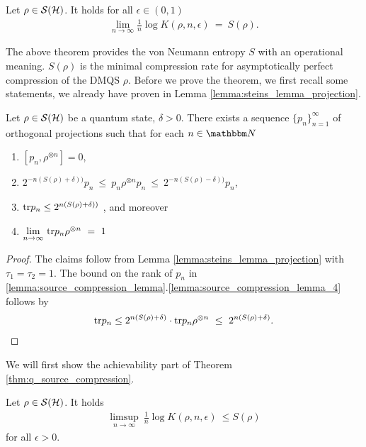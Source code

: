 \begin{theorem} \label{thm:q_source_compression}
 Let $\rho \in {\mathcal S}({\mathcal H})$. It holds for all $\epsilon \in (0,1)$ 
 \begin{align*}
  \underset{n \rightarrow \infty}{\lim} \frac{1}{n} \log K(\rho, n, \epsilon) \ = \ S(\rho).
 \end{align*}
 \end{theorem}
 The above theorem provides the von Neumann entropy $S$ with an operational meaning. $S(\rho)$ is 
 the minimal compression rate for asymptotically perfect compression of the DMQS $\rho$. 
 Before we prove the theorem, we first recall some statements, we already have proven in Lemma \ref{lemma:steins_lemma_projection}. 
\begin{lemma}
 Let $\rho \in {\mathcal S}({\mathcal H})$ be a quantum state, $\delta > 0$. There exists a sequence $\{p_n\}_{n=1}^\infty$ of orthogonal projections such that for each $n \in \bbmN$
 \begin{enumerate} \label{lemma:source_compression_lemma}
  \item $[p_n, \rho^{\otimes n}] = 0$, \label{lemma:source_compression_lemma_1}
  \item $2^{-n(S(\rho) + \delta))} p_n \ \leq \ p_n \rho^{\otimes n} p_n \ \leq \ 2^{-n(S(\rho) - \delta))} p_n$, 
  \item $\mathrm{tr} p_n \leq 2^{n(S(\rho) + \delta))}$ , and moreover \label{lemma:source_compression_lemma_4}
  \item $\underset{n \rightarrow \infty}{\lim} \ \mathrm{tr} p_n  \rho^{\otimes n} \ = \ 1$ \label{lemma:source_compression_lemma_5}
  \end{enumerate}
\begin{proof}
 The claims follow from Lemma \ref{lemma:steins_lemma_projection} with $\tau_1 = \tau_2 = 1$. The bound on the rank of $p_n$ in \ref{lemma:source_compression_lemma}.\ref{lemma:source_compression_lemma_4} 
 follows by 
 \begin{align*}
  \tr p_n \leq 2^{n(S(\rho) + \delta)} \cdot \tr p_n \rho^{\otimes n} \ \leq \ 2^{n(S(\rho) + \delta)}.
  \end{align*}

\end{proof}
\end{lemma}
We will first show the achievability part of Theorem \ref{thm:q_source_compression}. 
\begin{proposition} \label{source_compression_achiev} 
 Let $\rho \in {\mathcal S}({\mathcal H})$. It holds
 \begin{align}
  \underset{n  \rightarrow \infty}{\limsup} \ \frac{1}{n} \log K(\rho, n, \epsilon) \ \leq S(\rho) %
 \end{align} 
 for all $\epsilon > 0$. 
\end{proposition}
